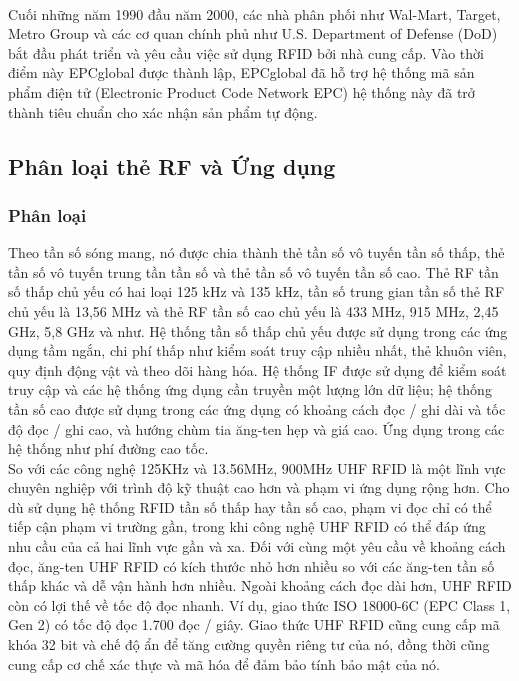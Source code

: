 \\
Cuối những năm 1990 đầu năm 2000, các nhà phân phối như Wal-Mart, Target, Metro Group và các cơ quan chính phủ như U.S. Department of Defense (DoD) bắt đầu phát triển và yêu cầu việc sử dụng RFID bởi nhà cung cấp. Vào thời điểm này EPCglobal được thành lập, EPCglobal đã hỗ trợ hệ thống mã sản phẩm điện tử (Electronic Product Code Network EPC) hệ thống này đã trở thành tiêu chuẩn cho xác nhận sản phẩm tự động.
\label{ref{fig1_5}}

\subsection{Phân loại thẻ RF và Ứng dụng}
\subsubsection{Phân loại}
Theo tần số sóng mang, nó được chia thành thẻ tần số vô tuyến tần số thấp, thẻ tần số vô tuyến trung tần tần số và thẻ tần số vô tuyến tần số cao. Thẻ RF tần số thấp chủ yếu có hai loại 125 kHz và 135 kHz, tần số trung gian tần số thẻ RF chủ yếu là 13,56 MHz và thẻ RF tần số cao chủ yếu là 433 MHz, 915 MHz, 2,45 GHz, 5,8 GHz và như. Hệ thống tần số thấp chủ yếu được sử dụng trong các ứng dụng tầm ngắn, chi phí thấp như kiểm soát truy cập nhiều nhất, thẻ khuôn viên, quy định động vật và theo dõi hàng hóa. Hệ thống IF được sử dụng để kiểm soát truy cập và các hệ thống ứng dụng cần truyền một lượng lớn dữ liệu; hệ thống tần số cao được sử dụng trong các ứng dụng có khoảng cách đọc / ghi dài và tốc độ đọc / ghi cao, và hướng chùm tia ăng-ten hẹp và giá cao. Ứng dụng trong các hệ thống như phí đường cao tốc.\\
So với các công nghệ 125KHz và 13.56MHz, 900MHz UHF RFID là một lĩnh vực chuyên nghiệp với trình độ kỹ thuật cao hơn và phạm vi ứng dụng rộng hơn. Cho dù sử dụng hệ thống RFID tần số thấp hay tần số cao, phạm vi đọc chỉ có thể tiếp cận phạm vi trường gần, trong khi công nghệ UHF RFID có thể đáp ứng nhu cầu của cả hai lĩnh vực gần và xa. Đối với cùng một yêu cầu về khoảng cách đọc, ăng-ten UHF RFID có kích thước nhỏ hơn nhiều so với các ăng-ten tần số thấp khác và dễ vận hành hơn nhiều. Ngoài khoảng cách đọc dài hơn, UHF RFID còn có lợi thế về tốc độ đọc nhanh. Ví dụ, giao thức ISO 18000-6C (EPC Class 1, Gen 2) có tốc độ đọc 1.700 đọc / giây. Giao thức UHF RFID cũng cung cấp mã khóa 32 bit và chế độ ẩn để tăng cường quyền riêng tư của nó, đồng thời cũng cung cấp cơ chế xác thực và mã hóa để đảm bảo tính bảo mật của nó.
